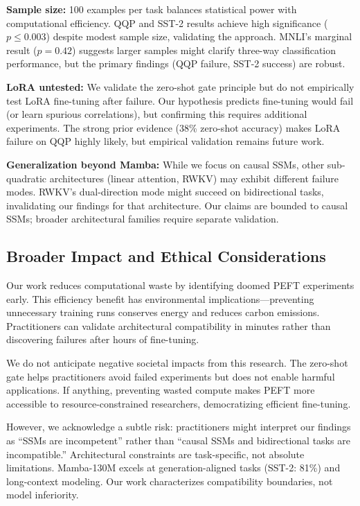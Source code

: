 \textbf{Sample size:} 100 examples per task balances statistical power with computational efficiency. QQP and SST-2 results achieve high significance ($p \leq 0.003$) despite modest sample size, validating the approach. MNLI's marginal result ($p = 0.42$) suggests larger samples might clarify three-way classification performance, but the primary findings (QQP failure, SST-2 success) are robust.

\textbf{LoRA untested:} We validate the zero-shot gate principle but do not empirically test LoRA fine-tuning after failure. Our hypothesis predicts fine-tuning would fail (or learn spurious correlations), but confirming this requires additional experiments. The strong prior evidence (38\% zero-shot accuracy) makes LoRA failure on QQP highly likely, but empirical validation remains future work.

\textbf{Generalization beyond Mamba:} While we focus on causal SSMs, other sub-quadratic architectures (linear attention, RWKV) may exhibit different failure modes. RWKV's dual-direction mode might succeed on bidirectional tasks, invalidating our findings for that architecture. Our claims are bounded to causal SSMs; broader architectural families require separate validation.

\subsection{Broader Impact and Ethical Considerations}

Our work reduces computational waste by identifying doomed PEFT experiments early. This efficiency benefit has environmental implications---preventing unnecessary training runs conserves energy and reduces carbon emissions. Practitioners can validate architectural compatibility in minutes rather than discovering failures after hours of fine-tuning.

We do not anticipate negative societal impacts from this research. The zero-shot gate helps practitioners avoid failed experiments but does not enable harmful applications. If anything, preventing wasted compute makes PEFT more accessible to resource-constrained researchers, democratizing efficient fine-tuning.

However, we acknowledge a subtle risk: practitioners might interpret our findings as ``SSMs are incompetent'' rather than ``causal SSMs and bidirectional tasks are incompatible.'' Architectural constraints are task-specific, not absolute limitations. Mamba-130M excels at generation-aligned tasks (SST-2: 81\%) and long-context modeling. Our work characterizes compatibility boundaries, not model inferiority.

